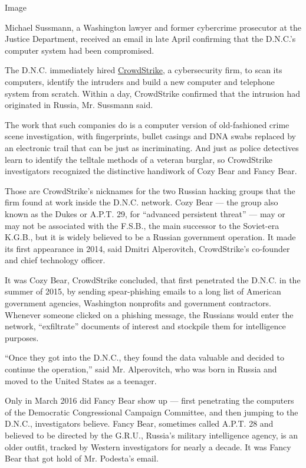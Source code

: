Image

Michael Sussmann, a Washington lawyer and former cybercrime prosecutor
at the Justice Department, received an email in late April confirming
that the D.N.C.'s computer system had been compromised.

The D.N.C. immediately hired
\href{https://www.crowdstrike.com/}{CrowdStrike}, a cybersecurity firm,
to scan its computers, identify the intruders and build a new computer
and telephone system from scratch. Within a day, CrowdStrike confirmed
that the intrusion had originated in Russia, Mr. Sussmann said.

The work that such companies do is a computer version of old-fashioned
crime scene investigation, with fingerprints, bullet casings and DNA
swabs replaced by an electronic trail that can be just as incriminating.
And just as police detectives learn to identify the telltale methods of
a veteran burglar, so CrowdStrike investigators recognized the
distinctive handiwork of Cozy Bear and Fancy Bear.

Those are CrowdStrike's nicknames for the two Russian hacking groups
that the firm found at work inside the D.N.C. network. Cozy Bear --- the
group also known as the Dukes or A.P.T. 29, for ``advanced persistent
threat'' --- may or may not be associated with the F.S.B., the main
successor to the Soviet-era K.G.B., but it is widely believed to be a
Russian government operation. It made its first appearance in 2014, said
Dmitri Alperovitch, CrowdStrike's co-founder and chief technology
officer.

It was Cozy Bear, CrowdStrike concluded, that first penetrated the
D.N.C. in the summer of 2015, by sending spear-phishing emails to a long
list of American government agencies, Washington nonprofits and
government contractors. Whenever someone clicked on a phishing message,
the Russians would enter the network, ``exfiltrate'' documents of
interest and stockpile them for intelligence purposes.

``Once they got into the D.N.C., they found the data valuable and
decided to continue the operation,'' said Mr. Alperovitch, who was born
in Russia and moved to the United States as a teenager.

Only in March 2016 did Fancy Bear show up --- first penetrating the
computers of the Democratic Congressional Campaign Committee, and then
jumping to the D.N.C., investigators believe. Fancy Bear, sometimes
called A.P.T. 28 and believed to be directed by the G.R.U., Russia's
military intelligence agency, is an older outfit, tracked by Western
investigators for nearly a decade. It was Fancy Bear that got hold of
Mr. Podesta's email.

